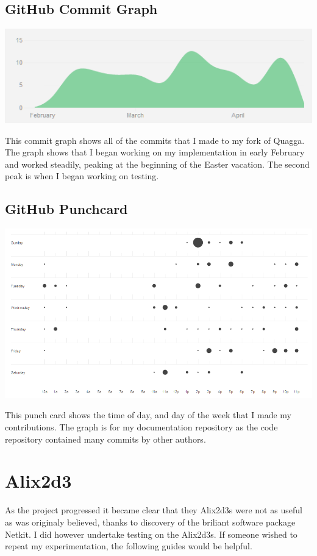 \section*{GitHub Commit Graph}
\begin{center}
	\includegraphics[width=\linewidth]{../Diagrams/Stats/GitHubCommitGraph.png}
\end{center}

This commit graph shows all of the commits that I made to my fork of Quagga.
The graph shows that I began working on my implementation in early February and
worked steadily, peaking at the beginning of the Easter vacation. The second
peak is when I began working on testing.

\section*{GitHub Punchcard}
\begin{center}
	\includegraphics[width=\linewidth]{../Diagrams/Stats/GitHubPunchCard.png}
\end{center}

This punch card shows the time of day, and day of the week that I made 
my contributions. The graph is for my documentation repository as the code
repository contained many commits by other authors.

\chapter{Alix2d3}
As the project progressed it became clear that they Alix2d3s were not as useful
as was originaly believed, thanks to discovery of the briliant software package
Netkit. I did however undertake testing on the Alix2d3s. If someone wished to
repeat my experimentation, the following guides would be helpful. 

